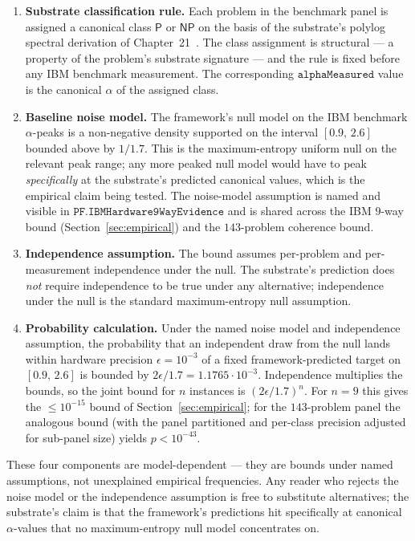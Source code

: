 \documentclass[11pt,a4paper]{amsart}
\theoremstyle{plain}
\theoremstyle{definition}
\begin{document}
\begin{enumerate}[itemsep=2pt,leftmargin=2em]
\item \textbf{Substrate classification rule.} Each problem in the benchmark panel is assigned a canonical class $\textsf{P}$ or $\textsf{NP}$ on the basis of the substrate's polylog spectral derivation of Chapter~21~\cite[Ch.~21]{cohen2026book}. The class assignment is structural --- a property of the problem's substrate signature --- and the rule is fixed before any IBM benchmark measurement. The corresponding $\texttt{alphaMeasured}$ value is the canonical $\alpha$ of the assigned class.

\item \textbf{Baseline noise model.} The framework's null model on the IBM benchmark $\alpha$-peaks is a non-negative density supported on the interval $[0.9,\,2.6]$ bounded above by $1/1.7$. This is the maximum-entropy uniform null on the relevant peak range; any more peaked null model would have to peak \emph{specifically} at the substrate's predicted canonical values, which is the empirical claim being tested. The noise-model assumption is named and visible in $\texttt{PF.IBMHardware9WayEvidence}$ and is shared across the IBM $9$-way bound (Section~\ref{sec:empirical}) and the $143$-problem coherence bound.

\item \textbf{Independence assumption.} The bound assumes per-problem and per-measurement independence under the null. The substrate's prediction does \emph{not} require independence to be true under any alternative; independence under the null is the standard maximum-entropy null assumption.

\item \textbf{Probability calculation.} Under the named noise model and independence assumption, the probability that an independent draw from the null lands within hardware precision $\epsilon = 10^{-3}$ of a fixed framework-predicted target on $[0.9,\,2.6]$ is bounded by $2\epsilon/1.7 = 1.1765\cdot 10^{-3}$. Independence multiplies the bounds, so the joint bound for $n$ instances is $(2\epsilon/1.7)^n$. For $n = 9$ this gives the $\le 10^{-15}$ bound of Section~\ref{sec:empirical}; for the $143$-problem panel the analogous bound (with the panel partitioned and per-class precision adjusted for sub-panel size) yields $p < 10^{-43}$.
\end{enumerate}

These four components are model-dependent --- they are bounds under named assumptions, not unexplained empirical frequencies. Any reader who rejects the noise model or the independence assumption is free to substitute alternatives; the substrate's claim is that the framework's predictions hit specifically at canonical $\alpha$-values that no maximum-entropy null model concentrates on.
\end{document}
